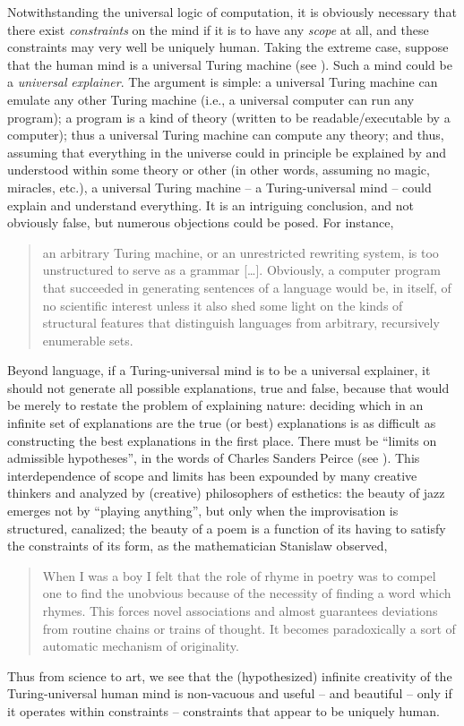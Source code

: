 \documentclass[output=paper]{langsci/langscibook}
\begin{document}
Notwithstanding the universal logic of computation, it is obviously
necessary that there exist \emph{constraints} on the mind if it is to have any
\emph{scope} at all, and these constraints may very well be uniquely human.
Taking the extreme case, suppose that the human mind is a universal Turing
machine (see \citealt{Watumull2015}). Such a mind could be a \emph{universal}
\emph{explainer}. The argument is simple: a universal Turing machine can
emulate any other Turing machine (i.e., a universal computer can run any
program); a program is a kind of theory (written to be readable/executable by a
computer); thus a universal Turing machine can compute any theory; and thus,
assuming that everything in the universe could in principle be explained by and
understood within some theory or other (in other words, assuming no magic,
miracles, etc.), a universal Turing machine -- a Turing-universal mind -- could
explain and understand everything. It is an intriguing conclusion, and not
obviously false, but numerous objections could be posed. For instance,
\blockquote{an arbitrary Turing machine, or an unrestricted rewriting system,
    is too unstructured to serve as a grammar [\dots]. Obviously, a computer
    program that succeeded in generating sentences of a language would be, in
    itself, of no scientific interest unless it also shed some light on the
kinds of structural features that distinguish languages from arbitrary,
recursively enumerable sets.\hfill\citep[360]{Chomsky1963}} Beyond language, if a
Turing-universal mind is to be a universal explainer, it should not generate
all possible explanations, true and false, because that would be merely to
restate the problem of explaining nature: deciding which in an infinite set of
explanations are the true (or best) explanations is as difficult as
constructing the best explanations in the first place. There must be “limits on
admissible hypotheses”, in the words of Charles Sanders Peirce (see
\citealt{Chomsky2006}). This interdependence of scope and limits has been
expounded by many creative thinkers and analyzed by (creative) philosophers of
esthetics: the beauty of jazz emerges not by “playing anything”, but only when
the improvisation is structured, canalized; the beauty of a poem is a function
of its having to satisfy the constraints of its form, as the mathematician
Stanislaw \citet[180]{Ulam1976} observed, \blockquote{When I was a boy I felt
    that the role of rhyme in poetry was to compel one to find the unobvious
    because of the necessity of finding a word which rhymes. This forces novel
    associations and almost guarantees deviations from routine chains or trains
    of thought. It becomes paradoxically a sort of automatic mechanism of
originality.} Thus from science to art, we see that the (hypothesized) infinite
creativity of the Turing-universal human mind is non-vacuous and useful -- and
beautiful -- only if it operates within constraints – constraints that appear
to be uniquely human.
\end{document}
